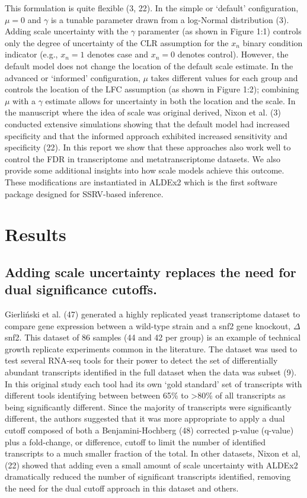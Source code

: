 \documentclass[
]{article}
\begin{document}
This formulation is quite flexible (3, 22). In the simple or `default'
configuration, \(\mu = 0\) and \(\gamma\) is a tunable parameter drawn
from a log-Normal distribution (3). Adding scale uncertainty with the
\(\gamma\) paramenter (as shown in Figure 1:1) controls only the degree
of uncertainty of the CLR assumption for the \(x_{n}\) binary condition
indicator (e.g., \(x_{n}=1\) denotes case and \(x_{n}=0\) denotes
control). However, the default model does not change the location of the
default scale estimate. In the advanced or `informed' configuration,
\(\mu\) takes different values for each group and controls the location
of the LFC assumption (as shown in Figure 1:2); combining \(\mu\) with a
\(\gamma\) estimate allows for uncertainty in both the location and the
scale. In the manuscript where the idea of scale was original derived,
Nixon et al. (3) conducted extensive simulations showing that the
default model had increased specificity and that the informed approach
exhibited increased sensitivity and specificity (22). In this report we
show that these approaches also work well to control the FDR in
transcriptome and metatranscriptome datasets. We also provide some
additional insights into how scale models achieve this outcome. These
modifications are instantiated in ALDEx2 which is the first software
package designed for SSRV-based inference.

\section{Results}\label{results}

\subsection{Adding scale uncertainty replaces the need for dual
significance
cutoffs.}\label{adding-scale-uncertainty-replaces-the-need-for-dual-significance-cutoffs.}

Gierliński et al. (47) generated a highly replicated yeast transcriptome
dataset to compare gene expression between a wild-type strain and a snf2
gene knockout, \(\Delta\)snf2. This dataset of 86 samples (44 and 42 per
group) is an example of technical growth replicate experiments common in
the literature. The dataset was used to test several RNA-seq tools for
their power to detect the set of differentially abundant transcripts
identified in the full dataset when the data was subset (9). In this
original study each tool had its own `gold standard' set of transcripts
with different tools identifying between between 65\% to
\textgreater80\% of all transcripts as being significantly different.
Since the majority of transcripts were significantly different, the
authors suggested that it was more appropriate to apply a dual cutoff
composed of both a Benjamini-Hochberg (48) corrected p-value (q-value)
plus a fold-change, or difference, cutoff to limit the number of
identified transcripts to a much smaller fraction of the total. In other
datasets, Nixon et al, (22) showed that adding even a small amount of
scale uncertainty with ALDEx2 dramatically reduced the number of
significant transcripts identified, removing the need for the dual
cutoff approach in this dataset and others.
\end{document}

